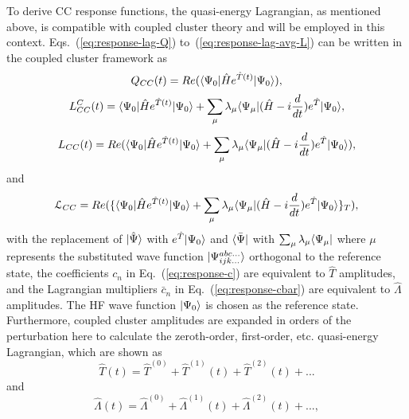 To derive CC response functions, the quasi-energy Lagrangian, as mentioned above, is compatible with coupled cluster theory and will be employed in this context. Eqs.~(\ref{eq:response-lag-Q}) to~(\ref{eq:response-lag-avg-L}) can be written in the coupled cluster framework as
\begin{equation}
Q_{CC}(t) = Re(\langle\Psi_{0} |\hat{H}e^{\hat{T}(t)}| \Psi_{0} \rangle),
\end{equation}
\begin{equation}
L^{C}_{CC}(t) = \langle\Psi_{0} |\hat{H}e^{\hat{T}(t)}| \Psi_{0} \rangle + 
\sum_{\mu}\lambda_{\mu}\langle\Psi_{\mu} |(\hat{H}-i\frac{d}{dt})e^{\hat{T}}| \Psi_{0} \rangle,
\end{equation}
\begin{equation}
L_{CC}(t) = Re(\langle\Psi_{0} |\hat{H}e^{\hat{T}(t)}| \Psi_{0} \rangle + 
\sum_{\mu}\lambda_{\mu}\langle\Psi_{\mu} |(\hat{H}-i\frac{d}{dt})e^{\hat{T}}| \Psi_{0} \rangle),
\end{equation}
and
\begin{equation}
\mathcal{L}_{CC} = Re(\{ \langle\Psi_{0} |\hat{H}e^{\hat{T}(t)}| \Psi_{0} \rangle + 
\sum_{\mu}\lambda_{\mu}\langle\Psi_{\mu} |(\hat{H}-i\frac{d}{dt})e^{\hat{T}}| \Psi_{0} \rangle\}_{T}),
\end{equation}
with the replacement of $| \hat{\Psi} \rangle$ with $e^{\hat{T}}| \Psi_{0} \rangle$ and $\langle\bar{\Psi} |$ with $\sum_{\mu}\lambda_{\mu}\langle\Psi_{\mu} |$ where $\mu$ represents the substituted wave function $| \Psi_{ijk...}^{abc...} \rangle$ orthogonal to the reference state, the coefficients $c_{n}$ in Eq.~(\ref{eq:response-c}) are equivalent to $\hat{T}$ amplitudes, and the Lagrangian multipliers $\bar{c}_{n}$ in Eq.~(\ref{eq:response-cbar}) are equivalent to $\hat{\Lambda}$ amplitudes. The HF wave function $| \Psi_{0} \rangle$ is chosen as the reference state. Furthermore, coupled cluster amplitudes are expanded in orders of the perturbation here to calculate the zeroth-order, first-order, etc. quasi-energy Lagrangian, which are shown as 
\begin{equation}
\hat{T}(t) = \hat{T}^{(0)} + \hat{T}^{(1)}(t) + \hat{T}^{(2)}(t) + ...
\end{equation}
and
\begin{equation}
\hat{\Lambda}(t) = \hat{\Lambda}^{(0)} + \hat{\Lambda}^{(1)}(t) + \hat{\Lambda}^{(2)}(t) + ...,
\end{equation}
